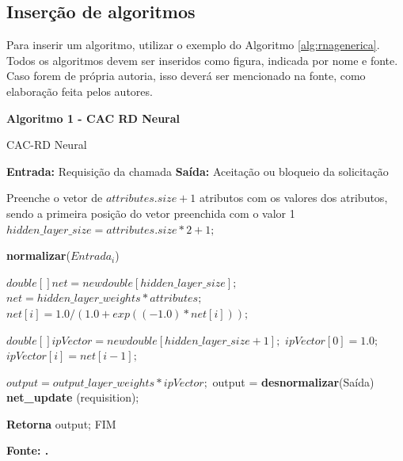 \subsection{\esp Inserção de algoritmos}

Para inserir um algoritmo, utilizar o exemplo do Algoritmo  \ref{alg:rnagenerica}.
Todos os algoritmos devem ser inseridos como figura, indicada por nome e  fonte. Caso 
forem de própria autoria, isso deverá ser mencionado na fonte, como elaboração feita pelos autores.

\begin{center}	
         \textbf{Algoritmo 1 -  CAC RD Neural}
	\vspace{-0.3cm}
\begin{minipage}[ht]{13cm}
\begin{algorithm}[H]
  \footnotesize
  \caption{CAC-RD Neural}
  \label{alg:rnagenerica}
  \begin{algorithmic}[1]
      \STATE \textbf{Entrada:} Requisição da chamada
    \STATE \textbf{Saída:} Aceitação ou bloqueio da solicitação
    
    \STATE Preenche o vetor de $attributes.size+1$ atributos com os valores dos atributos, sendo a primeira posição do vetor preenchida com o valor 1
		\STATE $hidden\_layer\_size =  attributes.size*2+1;$

    	\STATE \textbf{normalizar}($Entrada_i$)
    \ENDFOR

		\STATE $double [] net = new double [hidden\_layer\_size];$
    \STATE $net = hidden\_layer\_weights * attributes;$
			\STATE $net [i] = 1.0 / (1.0 + exp((-1.0)*net[i]));$
		\ENDFOR

		\STATE $double [] ipVector = new double [hidden\_layer\_size+1];$
    \STATE $ipVector [0] = 1.0;$
			\STATE $ipVector [i] = net [i-1];$
		\ENDFOR
		
		\STATE $output = output\_layer\_weights *  ipVector;$
    \STATE output = \textbf{desnormalizar}(Saída)
    \STATE \textbf{net\_update} (requisition);
    
    \STATE \textbf{Retorna} output; FIM
  \end{algorithmic}
\end{algorithm}

\small \centering \textbf{\footnotesize Fonte: .}
\end{minipage}
\end{center}


